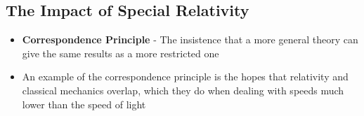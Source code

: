 \subsection{The Impact of Special Relativity}
\begin{itemize}
    \item \textbf{Correspondence Principle} - The insistence that a more general theory can give the same results as a more restricted one
    \item An example of the correspondence principle is the hopes that relativity and classical mechanics overlap, which they do when dealing with speeds much lower than the speed of light
\end{itemize}

\newpage